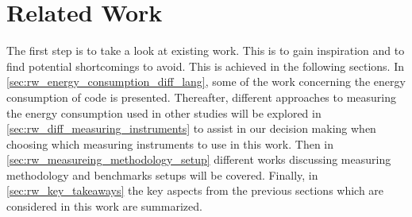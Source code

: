 \chapter{Related Work}\label{ch:related_work}

The first step is to take a look at existing work. This is to gain inspiration and to find potential shortcomings to avoid. This is achieved in the following sections. In \cref{sec:rw_energy_consumption_diff_lang}, some of the work concerning the energy consumption of code is presented. Thereafter, different approaches to measuring the energy consumption used in other studies will be explored in \cref{sec:rw_diff_measuring_instruments} to assist in our decision making when choosing which measuring instruments to use in this work. Then in \cref{sec:rw_measureing_methodology_setup} different works discussing measuring methodology and benchmarks setups will be covered. Finally, in \cref{sec:rw_key_takeaways} the key aspects from the previous sections which are considered in this work are summarized.


% 


